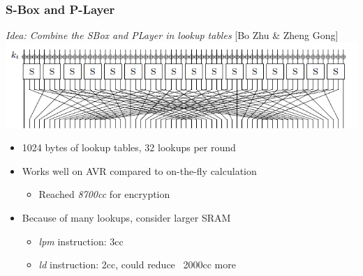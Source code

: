 \documentclass{beamer}
\begin{document}
\begin{frame}[fragile]
\frametitle{S-Box and P-Layer}
\emph{Idea: Combine the SBox and PLayer in lookup tables} [Bo Zhu \& Zheng Gong]
\includegraphics[width=\textwidth]{spnet.png}
\begin{itemize}
\item 1024 bytes of lookup tables, 32 lookups per round
\item Works well on AVR compared to on-the-fly calculation
  \begin{itemize}
    \item Reached \emph{8700cc} for encryption
  \end{itemize}
\item Because of many lookups, consider larger SRAM
  \begin{itemize}
    \item \textit{lpm} instruction: 3cc
    \item \textit{ld} instruction: 2cc, could reduce ~2000cc more
  \end{itemize}
\end{itemize}
\end{frame}
\end{document}
